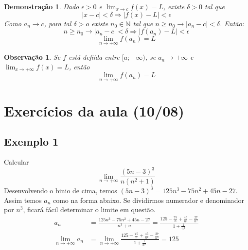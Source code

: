 \documentclass[12pt,openany, letterpaper]{book}
\newtheorem{demonstration}{Demonstração}
\newtheorem{obs}{Observação}
\begin{document}
\begin{demonstration}Dado $\epsilon > 0$ e $\displaystyle{\lim_{x \rightarrow c} f(x) = L}$, existe $\delta > 0$ tal que $$ |x-c| < \delta \Rightarrow |f(x) - L| < \epsilon $$ \hspace{5mm} Como $a_n \rightarrow c$, para tal $\delta > o$ existe $n_0 \in \mathds{N}$ tal que $n \geq n_0 \rightarrow |a_n - c| < \delta$. Então: $$n \geq n_0 \rightarrow |a_n - c| < \delta \Rightarrow |f(a_n) - L| < \epsilon$$ $$ \lim_{n \rightarrow +\infty} f(a_n) = L$$
\end{demonstration}

\begin{obs} Se $f$ está defiida entre $[a;+\infty)$, se $a_n \rightarrow +\infty$ e $\displaystyle{\lim_{x \rightarrow +\infty} f(x) =L}$, então $$\lim_{n \rightarrow +\infty} f(a_n) =L$$
\end{obs}

\section{Exercícios da aula (10/08)}
\label{sec:s22}

\subsection*{Exemplo 1}
\label{subsec:ex221}
\hspace{5mm}Calcular $$\lim_{n \rightarrow +\infty} \frac{(5n-3)^3}{n(n^2+1)}$$
Desenvolvendo o binio de cima, temos $(5n-3)^3 = 125n^3-75n^2+45n -27$. Assim temos $a_n$ como na forma abaixo. Se dividirmos numerador e denominador por $n^3$, ficará fácil determinar o limite em questão.
\begin{align*}
a_n &= \frac{125n^3-75n^2+45n -27}{n^3+n} =  \frac{125 - \frac{75}{n} + \frac{45}{n^2} - \frac{27}{n^3}}{1 + \frac{1}{n^2}} \\
\lim_{n \rightarrow + \infty} a_n &= \lim_{n \rightarrow + \infty} \frac{125 - \frac{75}{n} + \frac{45}{n^2} - \frac{27}{n^3}}{1 + \frac{1}{n^2}} = 125\\
\end{align*}
\end{document}
